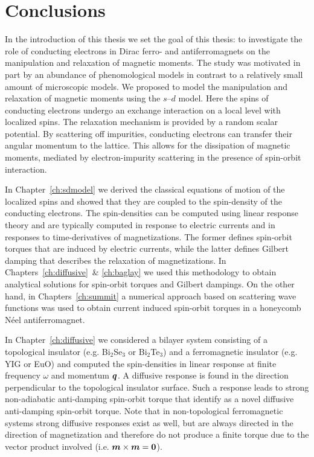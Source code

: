 \chapter{Conclusions}
In the introduction of this thesis we set the goal of this thesis: to investigate the role of conducting electrons in Dirac ferro- and antiferromagnets on the manipulation and relaxation of magnetic moments. The study was motivated in part by an abundance of phenomological models in contrast to a relatively small amount of microscopic models. We proposed to model the manipulation and relaxation of magnetic moments using the $s$--$d$ model. Here the spins of conducting electrons undergo an exchange interaction on a local level with localized spins. The relaxation mechanism is provided by a random scalar potential. By scattering off impurities, conducting electrons can transfer their angular momentum to the lattice. This allows for the dissipation of magnetic moments, mediated by electron-impurity scattering in the presence of spin-orbit interaction. 

In Chapter~\ref{ch:sdmodel} we derived the classical equations of motion of the localized spins and showed that they are coupled to the spin-density of the conducting electrons. The spin-densities can be computed using linear response theory and are typically computed in response to electric currents and in responses to time-derivatives of magnetizations. The former defines spin-orbit torques that are induced by electric currents, while the latter defines Gilbert damping that describes the relaxation of magnetizations. In Chapters~\ref{ch:diffusive}\ & \ref{ch:baglay} we used this methodology to obtain analytical solutions for spin-orbit torques and Gilbert dampings. On the other hand, in Chapters~\ref{ch:summit} a numerical approach based on scattering wave functions was used to obtain current induced spin-orbit torques in a honeycomb N\'eel antiferromagnet. 

In Chapter~\ref{ch:diffusive} we considered a bilayer system consisting of a topological insulator (e.g. Bi$_2$Se$_3$ or Bi$_2$Te$_3$) and a ferromagnetic insulator (e.g. YIG or EuO) and computed the spin-densities in linear response at finite frequency $\omega$ and momentum $\boldsymbol{q}$. A diffusive response is found in the direction perpendicular to the topological insulator surface. Such a response leads to strong non-adiabatic anti-damping spin-orbit torque that identify as a novel diffusive anti-damping spin-orbit torque. Note that in non-topological ferromagnetic systems strong diffusive responses exist as well, but are always directed in the direction of magnetization and therefore do not produce a finite torque due to the vector product involved (i.e. $\boldsymbol{m}\times\boldsymbol{m}=\boldsymbol{0}$).

